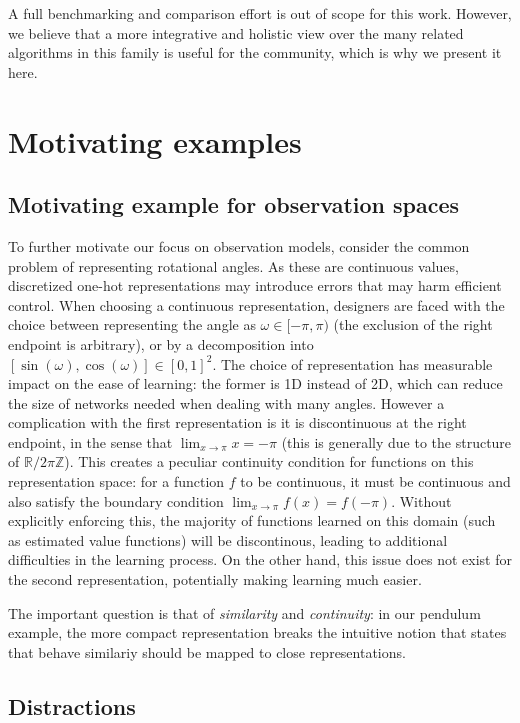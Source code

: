 A full benchmarking and comparison effort is out of scope for this work.
However, we believe that a more integrative and holistic view over the many related algorithms in this family is useful for the community, which is why we present it here.

\section{Motivating examples}
\subsection{Motivating example for observation spaces}
\label{app:observation_motivation}

To further motivate our focus on observation models, consider the common problem of representing rotational angles.
As these are continuous values, discretized one-hot representations may introduce errors that may harm efficient control.
When choosing a continuous representation, designers are faced with the choice between representing the angle as $\omega\in[-\pi,\pi)$ (the exclusion of the right endpoint is arbitrary), or by a decomposition into $[\sin(\omega),\cos(\omega)]\in [0,1]^2$.
The choice of representation has measurable impact on the ease of learning: the former is 1D instead of 2D, which can reduce the size of networks needed when dealing with many angles. However a complication with the first representation is it is discontinuous at the right endpoint, in the sense that $\lim_{x\to \pi}x = -\pi$ (this is generally due to the structure of $\mathbb{R}/2\pi\mathbb{Z}$). This creates a peculiar continuity condition for functions on this representation space: for a function $f$ to be continuous, it must be continuous and also satisfy the boundary condition $\lim_{x\to \pi}f(x) = f(-\pi)$. Without explicitly enforcing this, the majority of functions learned on this domain (such as estimated value functions) will be discontinous, leading to additional difficulties in the learning process. On the other hand, this issue does not exist for the second representation, potentially making learning much easier.

The important question is that of \emph{similarity} and \emph{continuity}: in our pendulum example, the more compact representation breaks the intuitive notion that states that behave similariy should be mapped to close representations.

\subsection{Distractions}
\label{app:distraction_motivation}

